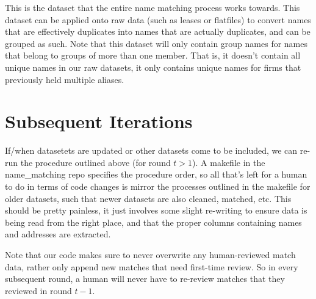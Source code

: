 \documentclass{article}
\begin{document}
This is the dataset that the entire name matching process works towards. This dataset can be applied onto raw data (such as leases or flatfiles) to convert names that are effectively duplicates into names that are actually duplicates, and can be grouped as such. Note that this dataset will only contain group names for names that belong to groups of more than one member. That is, it doesn't contain all unique names in our raw datasets, it only contains unique names for firms that previously held multiple aliases.  

\section{Subsequent Iterations}
If/when datasetets are updated or other datasets come to be included, we can re-run the procedure outlined above (for round $t > 1$). A makefile in the name\_matching repo specifies the procedure order, so all that's left for a human to do in terms of code changes is mirror the processes outlined in the makefile for older datasets, such that newer datasets are also cleaned, matched, etc. This should be pretty painless, it just involves some slight re-writing to ensure data is being read from the right place, and that the proper columns containing names and addresses are extracted. 

Note that our code makes sure to never overwrite any human-reviewed match data, rather only append new matches that need first-time review. So in every subsequent round, a human will never have to re-review matches that they reviewed in round $t - 1$.  
\end{document}
